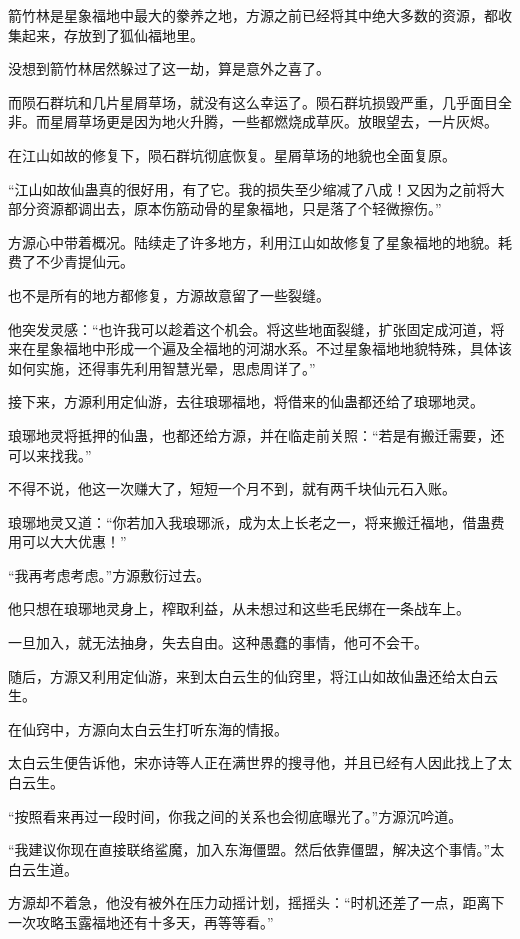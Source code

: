 \begin{this_body}
箭竹林是星象福地中最大的豢养之地，方源之前已经将其中绝大多数的资源，都收集起来，存放到了狐仙福地里。

没想到箭竹林居然躲过了这一劫，算是意外之喜了。

而陨石群坑和几片星屑草场，就没有这么幸运了。陨石群坑损毁严重，几乎面目全非。而星屑草场更是因为地火升腾，一些都燃烧成草灰。放眼望去，一片灰烬。

在江山如故的修复下，陨石群坑彻底恢复。星屑草场的地貌也全面复原。

“江山如故仙蛊真的很好用，有了它。我的损失至少缩减了八成！又因为之前将大部分资源都调出去，原本伤筋动骨的星象福地，只是落了个轻微擦伤。”

方源心中带着概况。陆续走了许多地方，利用江山如故修复了星象福地的地貌。耗费了不少青提仙元。

也不是所有的地方都修复，方源故意留了一些裂缝。

他突发灵感：“也许我可以趁着这个机会。将这些地面裂缝，扩张固定成河道，将来在星象福地中形成一个遍及全福地的河湖水系。不过星象福地地貌特殊，具体该如何实施，还得事先利用智慧光晕，思虑周详了。”

接下来，方源利用定仙游，去往琅琊福地，将借来的仙蛊都还给了琅琊地灵。

琅琊地灵将抵押的仙蛊，也都还给方源，并在临走前关照：“若是有搬迁需要，还可以来找我。”

不得不说，他这一次赚大了，短短一个月不到，就有两千块仙元石入账。

琅琊地灵又道：“你若加入我琅琊派，成为太上长老之一，将来搬迁福地，借蛊费用可以大大优惠！”

“我再考虑考虑。”方源敷衍过去。

他只想在琅琊地灵身上，榨取利益，从未想过和这些毛民绑在一条战车上。

一旦加入，就无法抽身，失去自由。这种愚蠢的事情，他可不会干。

随后，方源又利用定仙游，来到太白云生的仙窍里，将江山如故仙蛊还给太白云生。

在仙窍中，方源向太白云生打听东海的情报。

太白云生便告诉他，宋亦诗等人正在满世界的搜寻他，并且已经有人因此找上了太白云生。

“按照看来再过一段时间，你我之间的关系也会彻底曝光了。”方源沉吟道。

“我建议你现在直接联络鲨魔，加入东海僵盟。然后依靠僵盟，解决这个事情。”太白云生道。

方源却不着急，他没有被外在压力动摇计划，摇摇头：“时机还差了一点，距离下一次攻略玉露福地还有十多天，再等等看。”


\end{this_body}
